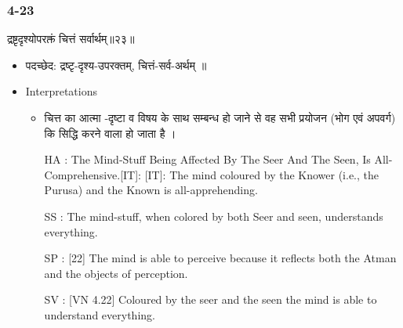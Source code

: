\begin{frame}[fragile]\frametitle{4-23}
\begin{sanskrit}
द्रष्टृदृश्योपरक्तं चित्तं सर्वार्थम्॥२३॥
\end{sanskrit}

	\begin{itemize}
	\item पदच्छेद:  ‌द्रष्टृ-दृश्य-उपरक्तम्, चित्तं-सर्व-अर्थम् ॥
	\item Interpretations
		\begin{itemize}	
		\item  चित्त का आत्मा -दृष्टा व विषय के साथ सम्बन्ध हो जाने से वह सभी प्रयोजन (भोग एवं अपवर्ग) कि सिद्धि करने वाला हो जाता है ।
		\item [HA]: The Mind-Stuff Being Affected By The Seer And The Seen, Is All-Comprehensive.[IT]: [IT]: The mind coloured by the Knower (i.e., the Purusa) and the Known is all-apprehending.
		\item [SS]: The mind-stuff, when colored by both Seer and seen, understands everything.
		\item [SP]: [22] The mind is able to perceive because it reflects both the Atman and the objects of perception.
		\item [SV]: [VN 4.22] Coloured by the seer and the seen the mind is able to understand everything.
		\end{itemize}
	\end{itemize}
\end{frame}


